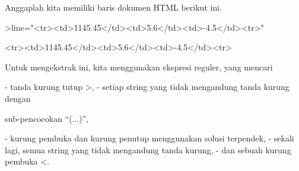 \documentclass[a4paper,10pt]{article}
\begin{document}
\begin{eulernotebook}
\begin{eulercomment}
\begin{eulercomment}
\begin{eulercomment}
\begin{eulercomment}
\begin{eulercomment}
\begin{eulercomment}
\begin{eulercomment}
\begin{eulercomment}
\begin{eulercomment}
\begin{eulercomment}
\begin{eulercomment}
\begin{eulercomment}
\begin{eulercomment}
\begin{eulercomment}
\begin{eulercomment}
\begin{eulercomment}
\begin{eulercomment}
\begin{eulercomment}
\begin{eulercomment}
\begin{eulercomment}
\begin{eulercomment}
\begin{eulercomment}
\begin{eulercomment}
\begin{eulercomment}
\begin{eulercomment}
\begin{eulercomment}
\begin{eulercomment}
\begin{eulercomment}
\begin{eulercomment}
\begin{eulercomment}
\begin{eulercomment}
\begin{eulercomment}
\begin{eulercomment}
\begin{eulercomment}
\begin{eulercomment}
\begin{eulercomment}
\begin{eulercomment}
\begin{eulercomment}
\begin{eulercomment}
\begin{eulercomment}
\begin{eulercomment}
\begin{eulercomment}
\begin{eulercomment}
\begin{eulercomment}
\begin{eulercomment}
\begin{eulercomment}
\begin{eulercomment}
\begin{eulercomment}
\begin{eulercomment}
\begin{eulercomment}
\begin{eulercomment}
Anggaplah kita memiliki baris dokumen HTML berikut ini.
\end{eulercomment}
\begin{eulerprompt}
>line="<tr><td>1145.45</td><td>5.6</td><td>-4.5</td><tr>"
\end{eulerprompt}
\begin{euleroutput}
  <tr><td>1145.45</td><td>5.6</td><td>-4.5</td><tr>
\end{euleroutput}
\begin{eulercomment}
Untuk mengekstrak ini, kita menggunakan ekspresi reguler, yang mencari

\end{eulercomment}
\begin{eulerttcomment}
 - tanda kurung tutup >,
 - setiap string yang tidak mengandung tanda kurung dengan
\end{eulerttcomment}
\begin{eulercomment}
sub-pencocokan “(...)”,\\
\end{eulercomment}
\begin{eulerttcomment}
 - kurung pembuka dan kurung penutup menggunakan solusi terpendek,
 - sekali lagi, semua string yang tidak mengandung tanda kurung,
 - dan sebuah kurung pembuka <.

\end{eulerttcomment}
\end{eulercomment}
\end{eulercomment}
\end{eulercomment}
\end{eulercomment}
\end{eulercomment}
\end{eulercomment}
\end{eulercomment}
\end{eulercomment}
\end{eulercomment}
\end{eulercomment}
\end{eulercomment}
\end{eulercomment}
\end{eulercomment}
\end{eulercomment}
\end{eulercomment}
\end{eulercomment}
\end{eulercomment}
\end{eulercomment}
\end{eulercomment}
\end{eulercomment}
\end{eulercomment}
\end{eulercomment}
\end{eulercomment}
\end{eulercomment}
\end{eulercomment}
\end{eulercomment}
\end{eulercomment}
\end{eulercomment}
\end{eulercomment}
\end{eulercomment}
\end{eulercomment}
\end{eulercomment}
\end{eulercomment}
\end{eulercomment}
\end{eulercomment}
\end{eulercomment}
\end{eulercomment}
\end{eulercomment}
\end{eulercomment}
\end{eulercomment}
\end{eulercomment}
\end{eulercomment}
\end{eulercomment}
\end{eulercomment}
\end{eulercomment}
\end{eulercomment}
\end{eulercomment}
\end{eulercomment}
\end{eulercomment}
\end{eulercomment}
\end{eulernotebook}
\end{document}
